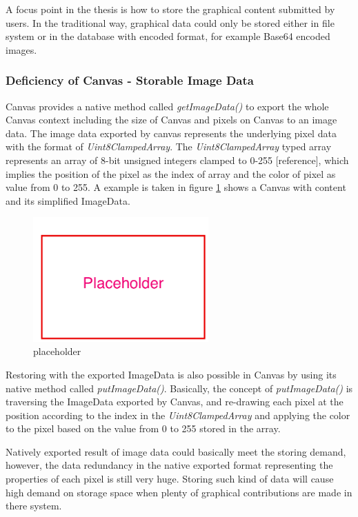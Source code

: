 A focus point in the thesis is how to store the graphical content submitted by users. In the traditional way, graphical data could only be stored either in file system or in the database with encoded format, for example Base64 encoded images. 

\subsubsection{Deficiency of Canvas - Storable Image Data}
Canvas provides a native method called \textit{getImageData()} to export the whole Canvas context including the size of Canvas and pixels on Canvas to an image data. The image data exported by canvas represents the underlying pixel data with the format of \textit{Uint8ClampedArray}. The \textit{Uint8ClampedArray} typed array represents an array of 8-bit unsigned integers clamped to 0-255 [reference], which implies the position of the pixel as the index of array and the color of pixel as value from 0 to 255. A example is taken in figure \ref{fig:canvas-imagedata} shows a Canvas with content and its simplified ImageData. 

\begin{figure}[!htbp]
  \centering
    \includegraphics[width=0.6\textwidth]{Figures/placeholder.png}
  \caption{placeholder}
  \label{fig:canvas-imagedata}
\end{figure}

Restoring with the exported ImageData is also possible in Canvas by using its native method called \textit{putImageData()}. Basically, the concept of \textit{putImageData()} is traversing the ImageData exported by Canvas, and re-drawing each pixel at the position according to the index in the \textit{Uint8ClampedArray} and applying the color to the pixel based on the value from 0 to 255 stored in the array.

Natively exported result of image data could basically meet the storing demand, however, the data redundancy in the native exported format representing the properties of each pixel is still very huge. Storing such kind of data will cause high demand on storage space when plenty of graphical contributions are made in there system.

